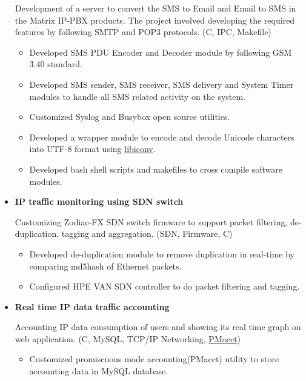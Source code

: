 \documentclass[letterpaper,11pt]{article}
\newcommand{\resitem}[1]{\item #1 \vspace{-2pt}}
\begin{document}
\begin{itemize}
    Development of a server to convert the SMS to Email and Email to SMS in the Matrix IP-PBX products. The project involved developing the required features by following SMTP and POP3 protocols. (C, IPC, Makefile)

	\begin{itemize}
		\resitem{Developed SMS PDU Encoder and Decoder module by following GSM 3.40 standard.}
		
		\resitem{Developed SMS sender, SMS receiver, SMS delivery and System Timer modules to handle all SMS related activity on the system.}
	  	
	  	\resitem{Customized Syslog and Busybox open source utilities.}

	    \resitem{Developed a wrapper module to encode and decode Unicode characters into UTF-8 format using \href{https://github.com/bnoordhuis/libiconv}{libiconv}.}
        
        \resitem{Developed bash shell scripts and makefiles to cross compile software modules.}
		
	\end{itemize}
	
\item
    \textbf{IP traffic monitoring using SDN switch}
    
     Customizing Zodiac-FX SDN switch firmware to support packet filtering, de-duplication, tagging and aggregation. (SDN, Firmware, C)
     
	\begin{itemize}
		\resitem{Developed de-duplication module to remove duplication in real-time by comparing md5hash of Ethernet packets.}
		
		\resitem{Configured HPE VAN SDN controller to do packet filtering and tagging.}
		
    \end{itemize}
    
\item
    \textbf{Real time IP data traffic accounting}
    
    Accounting IP data consumption of users and showing its real time graph on web application. (C, MySQL, TCP/IP Networking, \href{https://github.com/mehul-m-prajapati/pmacct}{PMacct})
	\begin{itemize}
	    \resitem{Customized promiscuous mode accounting(PMacct) utility to store accounting data in MySQL database.}
	

\end{itemize}
\end{itemize}
\end{document}
